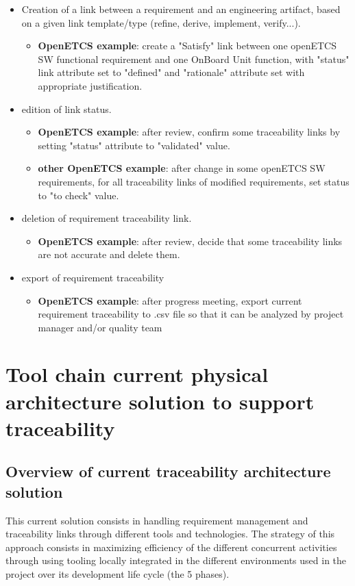 \documentclass[11pt]{template/openetcs_report}
\begin{document}
\begin{itemize}

\item Creation of a link between a requirement and an engineering artifact, based on a given link template/type (refine, derive, implement, verify...). 
\begin{itemize} \item \textbf{OpenETCS example}: create a "Satisfy" link between one openETCS SW functional requirement and one OnBoard Unit function, with  "status" link attribute set to "defined" and "rationale" attribute set with appropriate justification.\end{itemize}

\item edition of link status. 
\begin{itemize} \item \textbf{OpenETCS example}: after review, confirm some traceability links  by setting "status" attribute to "validated" value.
	\item \textbf{other OpenETCS example}: after change in some openETCS SW requirements, for all traceability links of modified requirements, set status to "to check" value.\end{itemize}

\item deletion of requirement traceability link. 
\begin{itemize} \item \textbf{OpenETCS example}: after review, decide that some traceability links are not accurate and delete them.\end{itemize}

\item export of requirement traceability
\begin{itemize} \item \textbf{OpenETCS example}: after progress meeting, export current requirement traceability to .csv file so that it can be analyzed by project manager and/or quality team\end{itemize}

\end{itemize}

\chapter{Tool chain current physical architecture solution to support traceability}
\label{sec-5}
\section{Overview of current traceability architecture solution}
This current solution consists in handling requirement management and traceability links through different tools and technologies. The strategy of this approach consists in maximizing efficiency of the different concurrent activities through using tooling locally integrated in the different environments used in the project over its development life cycle (the 5 phases).
\end{document}
